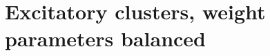 \documentclass[reqno]{siamonline190516}
\begin{document}
% 

\section{Excitatory clusters, weight parameters balanced}
\end{document}
